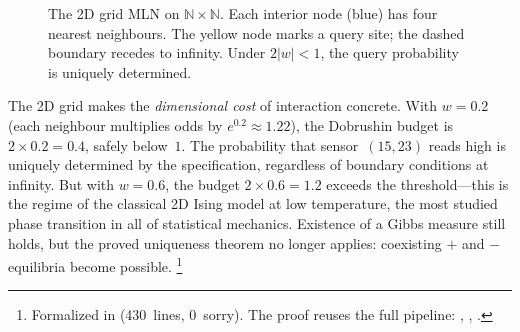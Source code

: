 \documentclass[11pt,openany]{report}
\begin{document}
\begin{figure}[htbp]
\centering
{}
\caption{The 2D grid MLN on $\mathbb{N}\times\mathbb{N}$.  Each interior
  node (blue) has four nearest neighbours.  The yellow node marks a query
  site; the dashed boundary recedes to infinity.  Under $2|w|<1$, the
  query probability is uniquely determined.}
\label{fig:grid-mln}
\end{figure}

\noindent
The 2D grid makes the \emph{dimensional cost} of interaction concrete.  With
$w = 0.2$ (each neighbour multiplies odds by $e^{0.2}\approx 1.22$), the
Dobrushin budget is $2\times 0.2 = 0.4$, safely below~$1$.  The probability
that sensor~$(15,23)$ reads high is uniquely determined by the specification,
regardless of boundary conditions at infinity.  But with $w = 0.6$, the budget
$2\times 0.6 = 1.2$ exceeds the threshold---this is the regime of the
classical 2D Ising model at low temperature, the most studied phase transition
in all of statistical mechanics.  Existence of a Gibbs measure still holds, but
the proved uniqueness theorem no longer applies: coexisting $+$ and $-$
equilibria become possible.%
\footnote{Formalized in
(430~lines, 0~sorry).  The proof reuses the full pipeline:
,
,
.}
\end{document}
